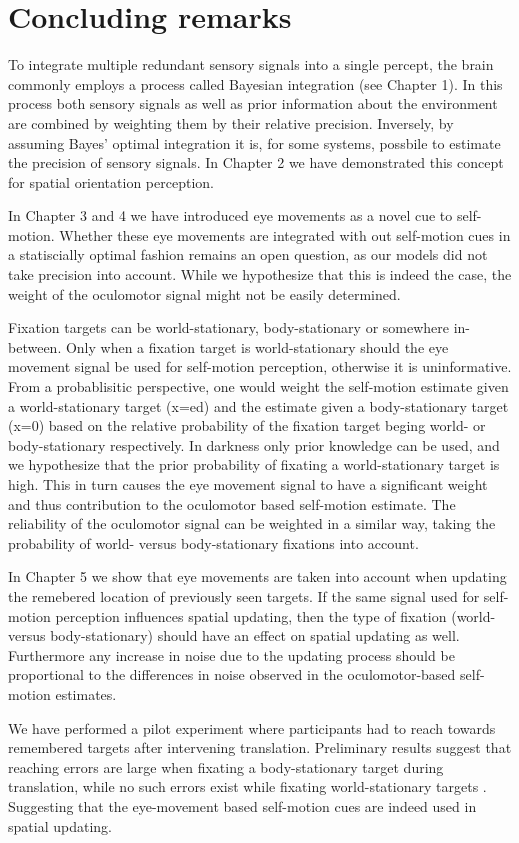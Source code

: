 \section{Concluding remarks}

To integrate multiple redundant sensory signals into a single percept, the brain commonly employs a process called Bayesian integration (see Chapter 1). In this process both sensory signals as well as prior information about the environment are combined by weighting them by their relative precision. Inversely, by assuming Bayes’ optimal integration it is, for some systems, possbile to estimate the precision of sensory signals. In Chapter 2 we have demonstrated this concept for spatial orientation perception.

In Chapter 3 and 4 we have introduced eye movements as a novel cue to self-motion. Whether these  eye movements are integrated with out self-motion cues in a statiscially optimal fashion remains an open question, as our models did not take precision into account. While we hypothesize that this is indeed  the case, the weight of the oculomotor signal might not be easily determined.

Fixation targets can be world-stationary, body-stationary or somewhere in-between. Only when a fixation target is world-stationary should the eye movement signal be used for self-motion perception, otherwise it is uninformative. From a probablisitic perspective, one would weight the self-motion estimate given a world-stationary target (x=ed) and the estimate given a body-stationary target (x=0) based on the relative probability of the fixation target beging world- or body-stationary respectively. In darkness only prior knowledge can be used, and we hypothesize that the prior probability of fixating a world-stationary target is high. This in turn causes the eye movement signal to have a significant weight and thus contribution to the oculomotor based self-motion estimate. The reliability of the oculomotor signal can be weighted in a similar way, taking the probability of  world- versus body-stationary fixations into account.

In Chapter 5 we show that eye movements are taken into account when updating the remebered location of previously seen targets. If the same signal used for self-motion perception influences spatial updating, then the type of fixation (world- versus body-stationary) should have an effect on spatial updating as well. Furthermore any increase in noise due to the  updating process should be proportional to the differences in noise observed in the oculomotor-based self-motion estimates. 

We have performed a pilot experiment where participants had to reach towards remembered targets after intervening translation. Preliminary results suggest that reaching errors are large when fixating a  body-stationary target during translation, while no such errors exist while fixating world-stationary targets \cite{clemens2010}. Suggesting that the eye-movement based self-motion cues are indeed used in spatial updating.
 
